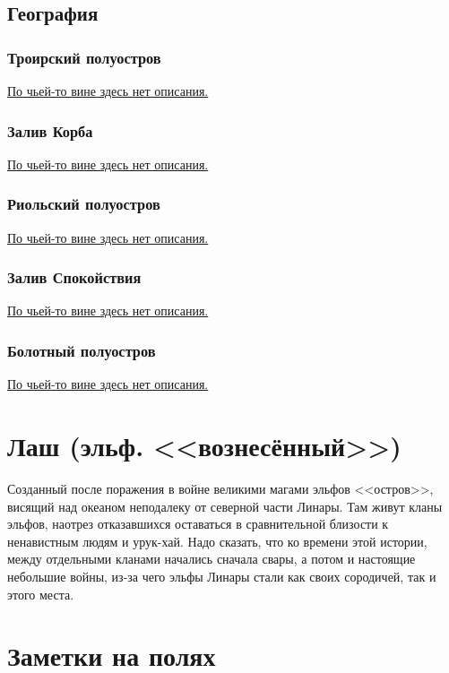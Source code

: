 \documentclass[12pt,a4paper]{book}
\begin{document}
\section{География}

\subsection{Троирский полуостров}

\underline{По чьей-то вине здесь нет описания.}

\subsection{Залив Корба}

\underline{По чьей-то вине здесь нет описания.}

\subsection{Риольский полуостров}

\underline{По чьей-то вине здесь нет описания.}

\subsection{Залив Спокойствия}

\underline{По чьей-то вине здесь нет описания.}

\subsection{Болотный полуостров}

\underline{По чьей-то вине здесь нет описания.}

\chapter{Лаш (эльф. <<вознесённый>>)}

Созданный после поражения в войне великими магами эльфов <<остров>>, висящий над океаном неподалеку от северной части Линары. Там живут кланы эльфов, наотрез отказавшихся оставаться в сравнительной близости к ненавистным людям и урук-хай. Надо сказать, что ко времени этой истории, между отдельными кланами начались сначала свары, а потом и настоящие небольшие войны, из-за чего эльфы Линары стали как своих сородичей, так и этого места.

\chapter*{Заметки на полях}
\end{document}
